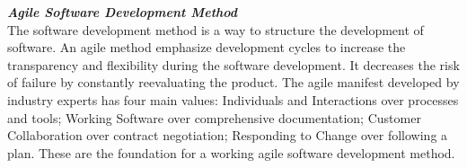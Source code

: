 \textbf{\textit{Agile Software Development Method}}\\
The software development method is a way to structure the development of software. An agile method emphasize development cycles to increase the transparency and flexibility during the software development. It decreases the risk of failure by constantly reevaluating the product. The agile manifest developed by industry experts\cite{beck2001manifestoAgile} has four main values: Individuals and Interactions over processes and tools; Working Software over comprehensive documentation; Customer Collaboration over contract negotiation; Responding to Change over following a plan. These are the foundation for a working agile software development method.
